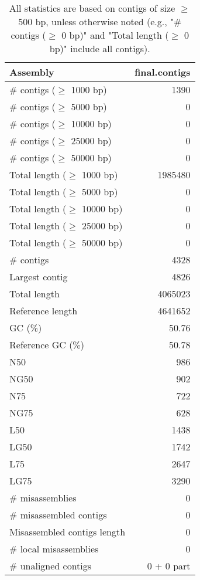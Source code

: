 \documentclass[12pt,a4paper]{article}
\begin{document}
\begin{table}[ht]
\begin{center}
\caption{All statistics are based on contigs of size $\geq$ 500 bp, unless otherwise noted (e.g., "\# contigs ($\geq$ 0 bp)" and "Total length ($\geq$ 0 bp)" include all contigs).}
\begin{tabular}{|l*{1}{|r}|}
\hline
Assembly & final.contigs \\ \hline
\# contigs ($\geq$ 1000 bp) & 1390 \\ \hline
\# contigs ($\geq$ 5000 bp) & 0 \\ \hline
\# contigs ($\geq$ 10000 bp) & 0 \\ \hline
\# contigs ($\geq$ 25000 bp) & 0 \\ \hline
\# contigs ($\geq$ 50000 bp) & 0 \\ \hline
Total length ($\geq$ 1000 bp) & 1985480 \\ \hline
Total length ($\geq$ 5000 bp) & 0 \\ \hline
Total length ($\geq$ 10000 bp) & 0 \\ \hline
Total length ($\geq$ 25000 bp) & 0 \\ \hline
Total length ($\geq$ 50000 bp) & 0 \\ \hline
\# contigs & 4328 \\ \hline
Largest contig & 4826 \\ \hline
Total length & 4065023 \\ \hline
Reference length & 4641652 \\ \hline
GC (\%) & 50.76 \\ \hline
Reference GC (\%) & 50.78 \\ \hline
N50 & 986 \\ \hline
NG50 & 902 \\ \hline
N75 & 722 \\ \hline
NG75 & 628 \\ \hline
L50 & 1438 \\ \hline
LG50 & 1742 \\ \hline
L75 & 2647 \\ \hline
LG75 & 3290 \\ \hline
\# misassemblies & 0 \\ \hline
\# misassembled contigs & 0 \\ \hline
Misassembled contigs length & 0 \\ \hline
\# local misassemblies & 0 \\ \hline
\# unaligned contigs & 0 + 0 part \\ \hline

\end{tabular}
\end{center}
\end{table}
\end{document}
